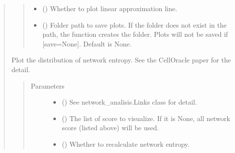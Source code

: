 \documentclass[letterpaper,10pt,english]{sphinxmanual}
\begin{document}
\begin{quote}
\begin{fulllineitems}
\begin{fulllineitems}
\begin{quote}
\begin{description}
\begin{itemize}
\item {} 
 () \textendash{} Whether to plot linear approximation line.

\item {} 
 () \textendash{} Folder path to save plots. If the folder does not exist in the path, the function creates the folder.
Plots will not be saved if {[}save=None{]}. Default is None.

\end{itemize}

\end{description}\end{quote}

\end{fulllineitems}


\begin{fulllineitems}
\label{\detokenize{modules/celloracle.network_analysis:celloracle.network_analysis.Links.plot_network_entropy_distributions}}
Plot the distribution of network entropy.
See the CellOracle paper for the detail.
\begin{quote}\begin{description}
\item[{Parameters}] \leavevmode\begin{itemize}
\item {} 
 () \textendash{} See network\_analisis.Links class for detail.

\item {} 
 () \textendash{} The list of score to visualize. If it is None, all network score (listed above) will be used.

\item {} 
 () \textendash{} Whether to recalculate network entropy.


\end{itemize}
\end{description}
\end{quote}
\end{fulllineitems}
\end{fulllineitems}
\end{quote}
\end{document}
